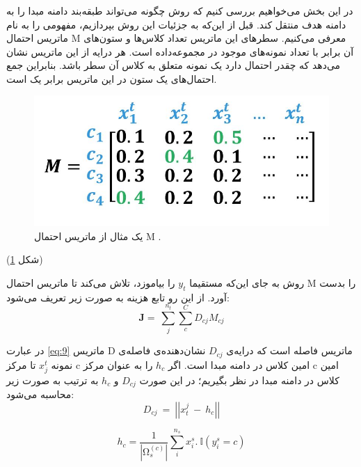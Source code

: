 {{		\subsubsection{}
		{
			در این بخش می‌خواهیم بررسی کنیم که روش 
			چگونه می‌تواند طبقه‌بند دامنه مبدا را به دامنه هدف منتقل کند. قبل از این‌که به جزئیات این روش بپردازیم، مفهومی را به نام ماتریس احتمال M معرفی می‌کنیم. سطر‌های این ماتریس تعداد کلاس‌ها و ستون‌های آن برابر با تعداد نمونه‌های موجود در مجموعه‌داده است. هر درایه از این ماتریس نشان می‌دهد که چقدر احتمال دارد یک نمونه متعلق به کلاس آن سطر باشد. بنابراین جمع احتمال‌های یک ستون در این ماتریس برابر یک است.
			\begin{figure}[h]
				\centering
				\includegraphics[scale=0.3]{images/annotation.JPG}
				\caption{یک مثال از ماتریس احتمال M .}
				\label{fig:7}
			\end{figure}
			(شکل
			\ref{fig:7})
			
			روش 
			به جای این‌که مستقیما 
			$y_t$
			را بیاموزد، تلاش می‌کند تا ماتریس احتمال M را بدست آورد. از این رو تابع هزینه به صورت زیر تعریف می‌شود:
			\begin{equation}
			\mathbf{J}=\ \sum_{j}^{n_t}\sum_{c}^{C}{D_{cj}}M_{cj}
			\label{eq:9}
			\end{equation}
			
			در عبارت 
			\ref{eq:9}
			ماتریس D ماتریس فاصله است که درایه‌ی 
			$D_{cj}$
			نشان‌دهنده‌ی فاصله‌ی نمونه
			$x_j^t$
			تا مرکز c‌ امین کلاس در دامنه مبدا است. اگر 
			$h_c$
			را به عنوان مرکز  c‌ امین کلاس در دامنه مبدا در نظر بگیریم؛ در این صورت 
			$D_{cj}$
			و 
			$h_c$
			به ترتیب به صورت زیر محاسبه می‌شود:
			\begin{equation}
			D_{cj}\ =\ \left|\left|x_t^j\ -\ h_c\right|\right|
			\label{eq:10}
			\end{equation}
			
			\begin{equation}
			h_c=\frac{1}{\left|\mathrm{\Omega}_s^{\left(c\right)}\right|}\sum_{i}^{n_s}{x_i^s.\ \mathbb{I}\left(y_i^s=c\right)}
			\label{eq:11}
			\end{equation}
			
}}}
